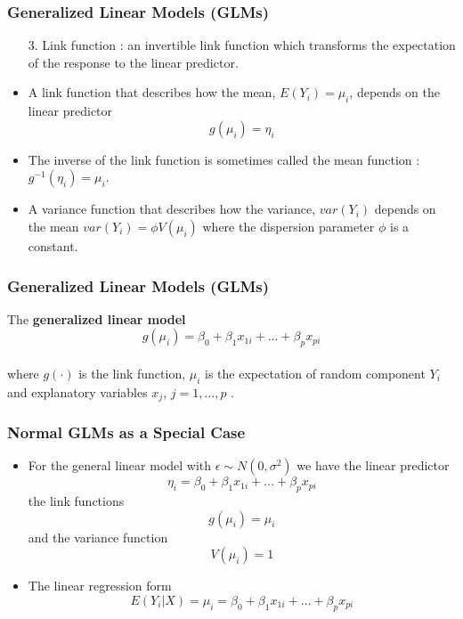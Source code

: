 \documentclass[10pt,xcolor={svgnames},t]{beamer}
\begin{document}
\begin{frame}
	\frametitle{Generalized Linear Models (GLMs)}
	
	\begin{itemize}
		\item[3.] Link function : an invertible link function which transforms the expectation of the response to the linear predictor.
\bigskip
	\end{itemize}
			
			\begin{itemize}
				\item A link function that describes how the mean, $E(Y_i )=\mu_i$, depends on the linear predictor
				\[ g(\mu_i )=\eta_i
				\]
				\smallskip
				\item The inverse of the link function is sometimes called the mean function : $g^{-1}(\eta_i )=\mu_i$.
				\bigskip
				\item A variance function that describes how the variance, $var(Y_i )$ depends on the mean $var(Y_i )=\phi V(\mu_i)$ where the dispersion parameter $\phi$ is a constant.
			\end{itemize}
			
	
\end{frame}
%
%
\begin{frame}
	\frametitle{Generalized Linear Models (GLMs)}
	
	\bigskip
	\begin{block}{The \textbf{generalized linear model}}
		\bigskip
		\begin{displaymath}
		g(\mu_i) = \beta_0 + \beta_1 x_{1i} + \ldots + \beta_p x_{pi} 
		\end{displaymath}
		\\
		where $g(\cdot)$ is the link function, $\mu_i$ is the expectation of random component $Y_i$ and explanatory variables $x_j$, $j=1 , \ldots , p$ .
	\end{block}
	\bigskip
	
	
\end{frame}
%
%
\begin{frame}
	\frametitle{Normal GLMs as a Special Case}
	
	\begin{itemize}
		\item For the general linear model with $\epsilon \sim N(0,\sigma^2)$ we have the linear predictor 
		\[
		\eta_i = \beta_0 + \beta_1 x_{1i} + \ldots + \beta_p x_{pi}
		\]
		the link functions
		\[ g(\mu_i ) = \mu_i
		\]
		and the variance function
		\[ V(\mu_i )=1
		\]
		\bigskip
		\item The linear regression form
		\[ 	E(Y_i | X)=\mu_i = \beta_0 + \beta_1 x_{1i} + \ldots + \beta_p x_{pi} 
		\]
	\end{itemize}
	
	
\end{frame}
\end{document}
